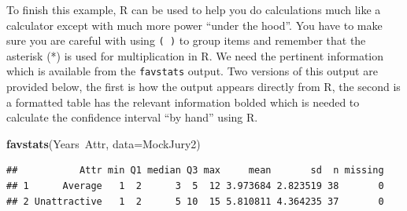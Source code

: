 \documentclass[]{book}
\newenvironment{Shaded}{\begin{snugshade}}{\end{snugshade}}
\newcommand{\KeywordTok}[1]{\textcolor[rgb]{0.13,0.29,0.53}{\textbf{{#1}}}}
\newcommand{\DataTypeTok}[1]{\textcolor[rgb]{0.13,0.29,0.53}{{#1}}}
\newcommand{\NormalTok}[1]{{#1}}
\begin{document}
To finish this example, R can be used to help you do calculations much
like a calculator except with much more power ``under the hood''. You
have to make sure you are careful with using \texttt{(\ )} to group
items and remember that the asterisk (*) is used for multiplication in
R. We need the pertinent information which is available from the
\texttt{favstats} output. Two versions of this output are provided
below, the first is how the output appears directly from R, the second
is a formatted table has the relevant information bolded which is needed
to calculate the confidence interval ``by hand'' using R.

\begin{Shaded}
\begin{Highlighting}[]
\KeywordTok{favstats}\NormalTok{(Years~Attr, }\DataTypeTok{data=}\NormalTok{MockJury2)}
\end{Highlighting}
\end{Shaded}

\begin{verbatim}
##           Attr min Q1 median Q3 max     mean       sd  n missing
## 1      Average   1  2      3  5  12 3.973684 2.823519 38       0
## 2 Unattractive   1  2      5 10  15 5.810811 4.364235 37       0
\end{verbatim}
\end{document}
